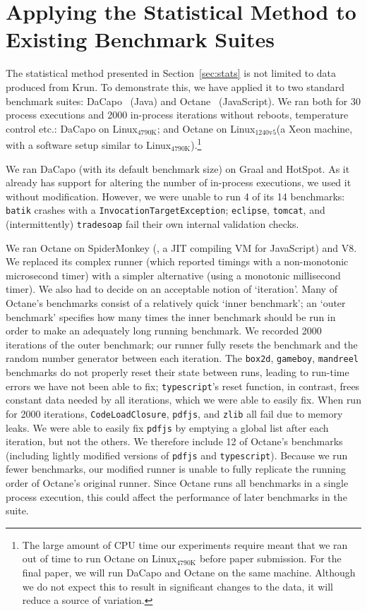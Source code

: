 \documentclass[acmlarge]{acmart}\settopmatter{printfolios=true}
\newcommand{\bencherthree}{Linux$_\mathrm{4790K}$\xspace}
\newcommand{\bencherseven}{Linux$_\mathrm{1240v5}$\xspace}
\newcommand{\numpexecs}{30\xspace}
\newcommand{\numiterations}{2000\xspace}
\begin{document}
\section{Applying the Statistical Method to Existing Benchmark Suites}
\label{sec:existing}
The statistical method presented in Section~\ref{sec:stats} is not limited to data
produced from Krun. To demonstrate this, we have applied it to two standard
benchmark suites: DaCapo~\cite{dacapo06} (Java) and Octane~\cite{octane}
(JavaScript). We ran both for \numpexecs process executions and \numiterations in-process
iterations without reboots, temperature control etc.: DaCapo on \bencherthree;
and Octane on \bencherseven (a Xeon machine, with a software setup
similar to \bencherthree).\footnote{The large amount of CPU time our
experiments require meant that we ran out of time to run Octane on \bencherthree
before paper submission. For the final paper, we will run DaCapo and Octane on
the same machine. Although we do not expect this to result in significant
changes to the data, it will reduce a source of variation.}

We ran DaCapo (with its default benchmark size) on Graal and HotSpot. As it already has support for
altering the number of in-process executions, we used it without modification.
However, we were unable to run 4 of its 14 benchmarks: \texttt{batik}
crashes with a \texttt{Invocation\-Target\-Exception}; \texttt{eclipse},
\texttt{tomcat}, and (intermittently) \texttt{tradesoap} fail their own internal
validation checks.

We ran Octane on SpiderMonkey (\spidermonkeyversion, a JIT compiling VM for JavaScript) and V8.
We replaced its complex runner (which reported timings with a non-monotonic
microsecond timer) with a simpler alternative (using a monotonic millisecond
timer). We also had to decide on an acceptable notion of `iteration'. Many of Octane's
benchmarks consist of a relatively quick `inner benchmark'; an `outer benchmark'
specifies how many times the inner benchmark should be run in order to make an
adequately long running benchmark. We recorded \numiterations iterations of the outer benchmark; our runner
fully resets the benchmark and the random number generator between each
iteration. The \texttt{box2d}, \texttt{gameboy}, \texttt{mandreel} benchmarks do
not properly reset their state between runs, leading to run-time errors we have
not been able to fix; \texttt{typescript}'s reset function, in contrast,
frees constant data needed by all iterations, which we were able
to easily fix. When run for \numiterations iterations, \texttt{CodeLoadClosure},
\texttt{pdfjs}, and \texttt{zlib} all fail due to memory leaks. We were able to
easily fix \texttt{pdfjs} by emptying a global list after each iteration, but not the
others. We therefore include 12 of Octane's benchmarks (including lightly
modified versions of \texttt{pdfjs} and \texttt{typescript}).
Because we run fewer benchmarks, our modified runner is unable to fully
replicate the running order of Octane's original runner. Since Octane runs all
benchmarks in a single process execution, this could affect the performance of
later benchmarks in the suite.
\end{document}
